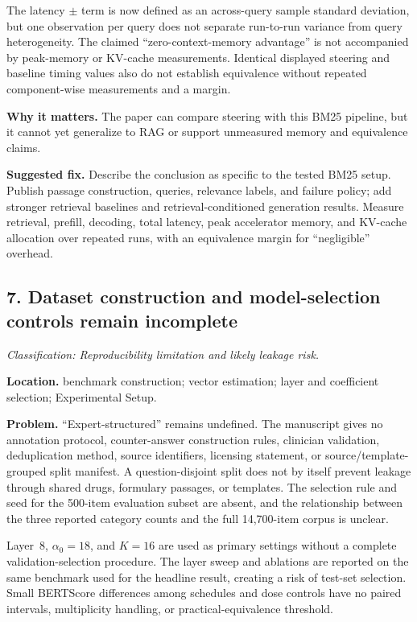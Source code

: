 \documentclass[11pt]{article}
\newcommand{\findinglabel}[1]{\textbf{#1}}
\newcommand{\classification}[1]{\textit{Classification: #1.}}
\begin{document}
The latency $\pm$ term is now defined as an across-query sample standard deviation, but one observation per query does not separate run-to-run variance from query heterogeneity.  The claimed ``zero-context-memory advantage'' is not accompanied by peak-memory or KV-cache measurements.  Identical displayed steering and baseline timing values also do not establish equivalence without repeated component-wise measurements and a margin.

\findinglabel{Why it matters.} The paper can compare steering with this BM25 pipeline, but it cannot yet generalize to RAG or support unmeasured memory and equivalence claims.

\findinglabel{Suggested fix.} Describe the conclusion as specific to the tested BM25 setup.  Publish passage construction, queries, relevance labels, and failure policy; add stronger retrieval baselines and retrieval-conditioned generation results.  Measure retrieval, prefill, decoding, total latency, peak accelerator memory, and KV-cache allocation over repeated runs, with an equivalence margin for ``negligible'' overhead.

\subsection*{7. Dataset construction and model-selection controls remain incomplete}

\classification{Reproducibility limitation and likely leakage risk}

\findinglabel{Location.} benchmark construction; vector estimation; layer and coefficient selection; Experimental Setup.

\findinglabel{Problem.} ``Expert-structured'' remains undefined.  The manuscript gives no annotation protocol, counter-answer construction rules, clinician validation, deduplication method, source identifiers, licensing statement, or source/template-grouped split manifest.  A question-disjoint split does not by itself prevent leakage through shared drugs, formulary passages, or templates.  The selection rule and seed for the 500-item evaluation subset are absent, and the relationship between the three reported category counts and the full 14,700-item corpus is unclear.

Layer~8, $\alpha_0=18$, and $K=16$ are used as primary settings without a complete validation-selection procedure.  The layer sweep and ablations are reported on the same benchmark used for the headline result, creating a risk of test-set selection.  Small BERTScore differences among schedules and dose controls have no paired intervals, multiplicity handling, or practical-equivalence threshold.
\end{document}

